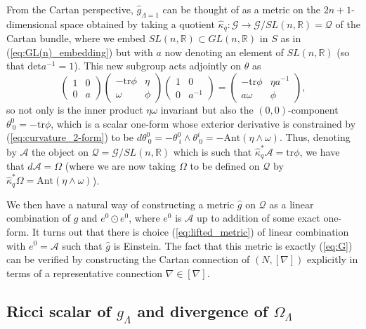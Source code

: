From the Cartan perspective, $\hat{g}_{\Lambda=1}$ can be thought
of as a metric on the $2n+1$-dimensional space obtained by taking
a quotient $\hat{\kappa}_q:\mathcal{G}\rightarrow \mathcal{G}/SL(n,\mathbb{R})=\mathcal{Q}$ of the Cartan
bundle, where we embed $SL(n,\mathbb{R})\subset GL(n,\mathbb{R})$
in $S$ as in (\ref{eq:GL(n)_embedding}) but with $a$ now denoting
an element of $SL(n,\mathbb{R})$ (so that $\mathrm{det}a^{-1}=1$).
This new subgroup acts adjointly on $\theta$ as
\[
\begin{pmatrix}1 & 0\\
0 & a
\end{pmatrix}\begin{pmatrix}-\mathrm{tr}\phi & \eta\\
\omega & \phi
\end{pmatrix}\begin{pmatrix}1 & 0\\
0 & a^{-1}
\end{pmatrix}=\begin{pmatrix}-\mathrm{tr}\phi & \eta a^{-1}\\
a\omega & \phi
\end{pmatrix},
\]
so not only is the inner product $\eta\omega$ invariant but also
the $(0,0)$-component $\theta_{\ 0}^{0}=\mathrm{-tr}\phi$, which
is a scalar one-form whose exterior derivative is constrained by (\ref{eq:curvature_2-form}) to be $ d\theta_{\ 0}^{0}=-\theta_{\ i}^{0}\wedge\theta_{\ 0}^{i}=-\mathrm{Ant}(\eta\wedge\omega)$.
Thus, denoting by $\mathcal{A}$ the object on $\mathcal{Q}=\mathcal{G}/SL(n,\mathbb{R})$
which is such that $\hat{\kappa}_q^{*}\mathcal{A}=\mathrm{tr}\phi$, we have that
$ d\mathcal{A}=\Omega$ (where we are now taking $\Omega$ to be defined on $\mathcal{Q}$ by $\hat{\kappa}_q^{*}\Omega=\mathrm{Ant}(\eta\wedge\omega)$).

We then have a natural way of constructing a metric $\hat{g}$
on $\mathcal{Q}$ as a linear combination of $g$ and $e^{0}\odot e^{0}$,
where $e^{0}$ is $\mathcal{A}$ up to addition of some exact one-form. It turns
out that there is choice (\ref{eq:lifted_metric}) of linear combination with $e^0=\mathcal{A}$ such that $\hat{g}$
is Einstein. The fact that this metric is exactly (\ref{eq:G}) can be verified
by constructing the Cartan connection of $(N,[\nabla])$ explicitly
in terms of a representative connection $\nabla\in[\nabla]$.

\subsection{Ricci scalar of $g_\Lambda$ and divergence of $\Omega_\Lambda$}

